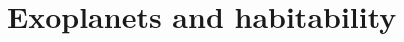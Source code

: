 


















































































\iffalse
\section{Exoplanets and habitability}

